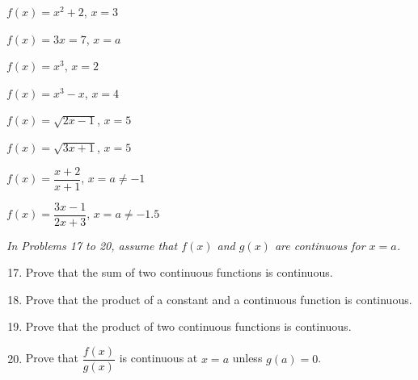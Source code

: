 \documentclass{report}
\begin{document}
\begin{enumerate}
      \setcounter{enumi}{8}
      \begin{multicols}{2}
            \item $f(x) = x^2 + 2$, $x = 3$
            \item $f(x) = 3x = 7$, $x = a$
      \end{multicols}
      \begin{multicols}{2}
            \item $f(x) = x^3$, $x = 2$
            \item $f(x) = x^3 - x$, $x = 4$
      \end{multicols}
      \begin{multicols}{2}
            \item $f(x) = \sqrt{2x - 1}$, $x = 5$
            \item $f(x) = \sqrt{3x + 1}$, $x = 5$
      \end{multicols}
      \begin{multicols}{2}
            \item $f(x) = \dfrac{x + 2}{x + 1}$, $x = a \neq -1$
            \item $f(x) = \dfrac{3x - 1}{2x + 3}$, $x = a \neq -1.5$
      \end{multicols}
\end{enumerate}
\textit{In Problems 17 to 20, assume that $f(x)$ and $g(x)$ are continuous for $x = a$.}
\begin{enumerate}
      \setcounter{enumi}{16}
      \item Prove that the sum of two continuous functions is continuous.
      \item Prove that the product of a constant and a continuous function is continuous.
      \item Prove that the product of two continuous functions is continuous.
      \item Prove that $\dfrac{f(x)}{g(x)}$ is continuous at $x = a$ unless $g(a) = 0$.
\end{enumerate}
\end{document}
